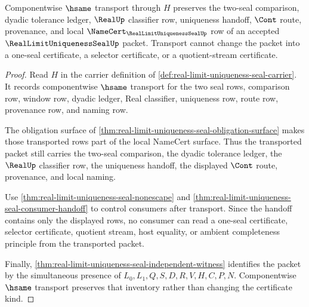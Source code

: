 \begin{theorem}
\label{thm:real-limit-uniqueness-seal-classifier-stability}
Componentwise $\hsame$ transport through $H$ preserves the two-seal comparison, dyadic tolerance ledger, $\RealUp$ classifier row, uniqueness handoff, $\Cont$ route, provenance, and local $\NameCert_{\RealLimitUniquenessSealUp}$ row of an accepted $\RealLimitUniquenessSealUp$ packet. Transport cannot change the packet into a one-seal certificate, a selector certificate, or a quotient-stream certificate.
\end{theorem}
\begin{proof}
Read $H$ in the carrier definition of \autoref{def:real-limit-uniqueness-seal-carrier}. It records componentwise $\hsame$ transport for the two seal rows, comparison row, window row, dyadic ledger, Real classifier, uniqueness row, route row, provenance row, and naming row.

The obligation surface of \autoref{thm:real-limit-uniqueness-seal-obligation-surface} makes those transported rows part of the local NameCert surface. Thus the transported packet still carries the two-seal comparison, the dyadic tolerance ledger, the $\RealUp$ classifier row, the uniqueness handoff, the displayed $\Cont$ route, provenance, and local naming.

Use \autoref{thm:real-limit-uniqueness-seal-nonescape} and \autoref{thm:real-limit-uniqueness-seal-consumer-handoff} to control consumers after transport. Since the handoff contains only the displayed rows, no consumer can read a one-seal certificate, selector certificate, quotient stream, host equality, or ambient completeness principle from the transported packet.

Finally, \autoref{thm:real-limit-uniqueness-seal-independent-witness} identifies the packet by the simultaneous presence of $L_0,L_1,Q,S,D,R,V,H,C,P,N$. Componentwise $\hsame$ transport preserves that inventory rather than changing the certificate kind.
\end{proof}

